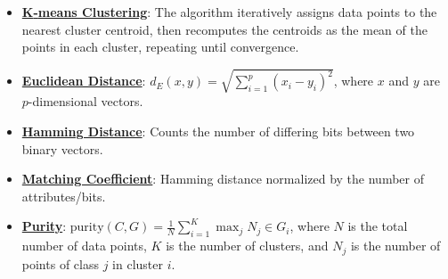 \documentclass{article}%
\begin{document}
\begin{itemize}[leftmargin=*]%
\item \href{https://purdue.brightspace.com/d2l/common/assets/pdfjs-d2l-dist/1.0.14-legacy/web/viewer.html?file=\%2Fcontent\%2Fenforced\%2F1095467-wl.202510.CS.24300.001\%2F12L2-distance-clusters.pdf\%3Fou\%3D1095467\&lang=en-us\&container=d2l-fileviewer-rendered-pdf\&fullscreen=d2l-fileviewer-rendered-pdf-dialog\&height=667#page=22}{\textbf{K{-}means Clustering}}: The algorithm iteratively assigns data points to the nearest cluster centroid, then recomputes the centroids as the mean of the points in each cluster, repeating until convergence.%
\item \href{https://purdue.brightspace.com/d2l/common/assets/pdfjs-d2l-dist/1.0.14-legacy/web/viewer.html?file=\%2Fcontent\%2Fenforced\%2F1095467-wl.202510.CS.24300.001\%2F12L2-distance-clusters.pdf\%3Fou\%3D1095467\&lang=en-us\&container=d2l-fileviewer-rendered-pdf\&fullscreen=d2l-fileviewer-rendered-pdf-dialog\&height=667#page=17}{\textbf{Euclidean Distance}}: $d_E(x, y) = \sqrt{\sum_{i=1}^{p} (x_i - y_i)^2}$, where $x$ and $y$ are $p$-dimensional vectors.%
\item \href{https://purdue.brightspace.com/d2l/common/assets/pdfjs-d2l-dist/1.0.14-legacy/web/viewer.html?file=\%2Fcontent\%2Fenforced\%2F1095467-wl.202510.CS.24300.001\%2F12L2-distance-clusters.pdf\%3Fou\%3D1095467\&lang=en-us\&container=d2l-fileviewer-rendered-pdf\&fullscreen=d2l-fileviewer-rendered-pdf-dialog\&height=667#page=19}{\textbf{Hamming Distance}}: Counts the number of differing bits between two binary vectors.%
\item \href{https://purdue.brightspace.com/d2l/common/assets/pdfjs-d2l-dist/1.0.14-legacy/web/viewer.html?file=\%2Fcontent\%2Fenforced\%2F1095467-wl.202510.CS.24300.001\%2F12L2-distance-clusters.pdf\%3Fou\%3D1095467\&lang=en-us\&container=d2l-fileviewer-rendered-pdf\&fullscreen=d2l-fileviewer-rendered-pdf-dialog\&height=667#page=19}{\textbf{Matching Coefficient}}: Hamming distance normalized by the number of attributes/bits.%
\item \href{https://purdue.brightspace.com/d2l/common/assets/pdfjs-d2l-dist/1.0.14-legacy/web/viewer.html?file=\%2Fcontent\%2Fenforced\%2F1095467-wl.202510.CS.24300.001\%2F12L2-distance-clusters.pdf\%3Fou\%3D1095467\&lang=en-us\&container=d2l-fileviewer-rendered-pdf\&fullscreen=d2l-fileviewer-rendered-pdf-dialog\&height=667#page=44}{\textbf{Purity}}: $\text{purity}(C, G) = \frac{1}{N} \sum_{i=1}^{K} \max_j N_j \in G_i$, where $N$ is the total number of data points, $K$ is the number of clusters, and $N_j$ is the number of points of class $j$ in cluster $i$.%
\end{itemize}%
\end{document}
